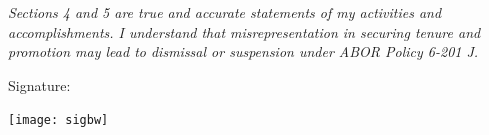 \documentclass[10pt]{article}
\begin{document}


\vspace{10mm}
{\em Sections 4 and 5 are true and accurate statements of my activities and accomplishments. I understand that misrepresentation in securing tenure and promotion may lead to dismissal or suspension under ABOR Policy 6-201 J.}
\vspace{4mm}

{\flushleft Signature:}

\texttt{[image: sigbw]}
\end{document}
